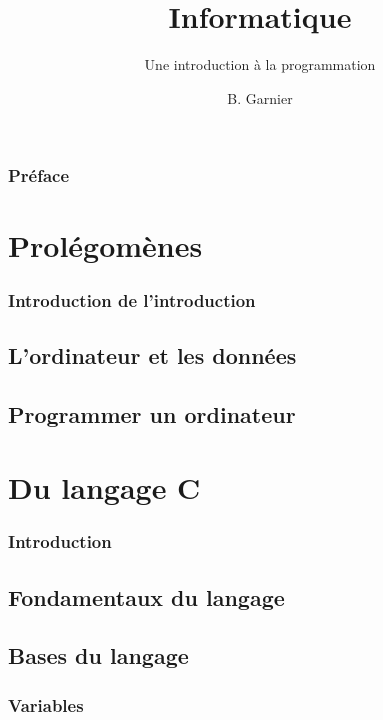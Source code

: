 \documentclass{minitelreport}
\begin{document}
\title{Informatique}
\subtitle{Une introduction à la programmation}
\author{B. Garnier}
\maketitle
\begin{refsection}
\section*{Préface}

\tableofcontents
\listoftables
\listofdefinition
\newpage
\part{Prolégomènes}
	\section*{Introduction de l'introduction}
	
	\chapter{L'ordinateur et les données}
		
	\chapter{Programmer un ordinateur}
		
\part{Du langage C}
	\section*{Introduction}
	
	\chapter{Fondamentaux du langage}
		
	\chapter{Bases du langage}
		\section{Variables}
		

\end{refsection}
\end{document}
